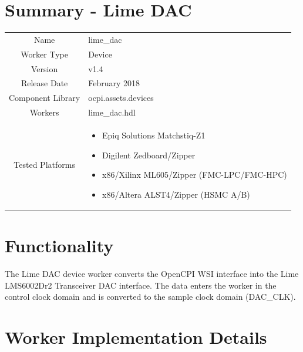 \documentclass{article}
\author{} %
\date{Version \docVersion} %
\title{\docTitle}
\def\docVersion{1.4}
\def\comp{lime\_dac}
\def\Comp{Lime DAC}
\begin{document}
\section*{Summary - \Comp}
\begin{tabular}{|c|M{13.5cm}|}
	\hline
	                  &                  \\
	\hline
	Name              & \comp            \\
	\hline
	Worker Type       & Device           \\
	\hline
	Version           & v\docVersion \\
	\hline
	Release Date      & February 2018 \\
	\hline
	Component Library & ocpi.assets.devices     \\
	\hline
	Workers           & \comp.hdl        \\
	\hline
	Tested Platforms  &
\begin{itemize}
  \item Epiq Solutions Matchstiq-Z1
  \item Digilent Zedboard/Zipper
  \item x86/Xilinx ML605/Zipper (FMC-LPC/FMC-HPC)
  \item x86/Altera ALST4/Zipper (HSMC A/B)
\end{itemize} \\
	\hline
\end{tabular}

\section*{Functionality}
\begin{flushleft}
	The Lime DAC device worker converts the OpenCPI WSI interface into the Lime LMS6002Dr2 Transceiver DAC interface. The data enters the worker in the control clock domain and is converted to the sample clock domain (DAC\_CLK).
\end{flushleft}

\section*{Worker Implementation Details}
\end{document}

